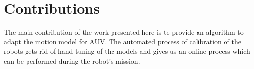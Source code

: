 \documentclass[12pt]{dalcsthesis}
\begin{document}

 

\section{Contributions}
The main contribution of the work presented here is to provide an algorithm to adapt the motion model for AUV. The automated process of calibration of the robots gets rid of hand tuning of the models and gives us an online process which can be performed during the robot's mission. 
  

\end{document}
